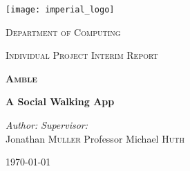\begin{titlepage}
    \begin{center}
        \vspace*{2cm}
        \texttt{[image: imperial\_logo]}
        \vspace{2cm}
        
        \LARGE
        \textsc{Department of Computing}
        
        \textsc{Individual Project Interim Report}
        
        \vspace{2cm}
        \vhrulefill{2pt}
        \vspace{0.2cm}
        
        \huge
        \textbf{\textsc{Amble}}
        
        \vspace{0.2cm}
        
        \LARGE
        \textbf{A Social Walking App}
        
        \vspace{0.2cm}
        \vhrulefill{2pt}
        \vspace{2cm}
        
        \begin{flushleft}
            \Large
            \textit{Author:}
            \hfill
            \textit{Supervisor:}\\
            Jonathan \textsc{Muller}
            \hfill
            Professor Michael \textsc{Huth}\\
        \end{flushleft}
        
        \vfill
        \Large
        \today
    \end{center}
\end{titlepage}